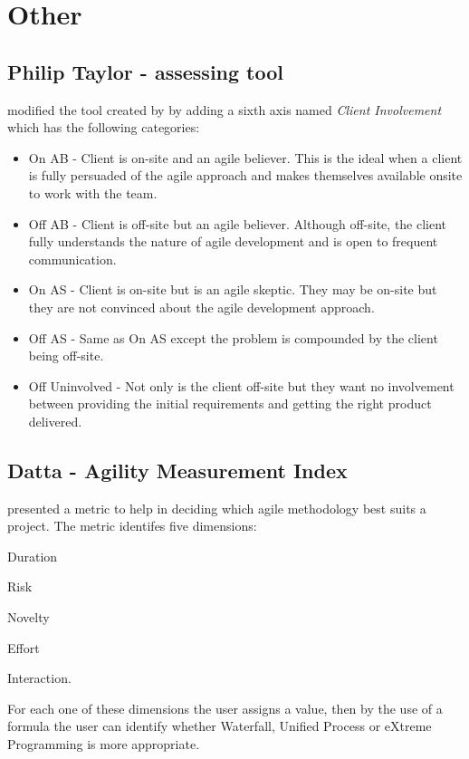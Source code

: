 \section{Other}

\subsection{Philip Taylor - assessing tool} 
\citet{taylor} modified the tool created by \citet{1231450} by adding a sixth axis named  \textit{Client Involvement} which has the following categories:

\begin{itemize}
\item On AB - Client is on-site and an agile believer. This is the ideal when a client is fully persuaded of the agile approach and makes themselves available onsite to work with the team.
\item Off AB - Client is off-site but an agile believer. Although off-site, the client fully understands the nature of agile development and is open to frequent communication.
\item On AS - Client is on-site but is an agile skeptic. They may be on-site but they are not convinced about the agile development approach.
\item Off AS - Same as On AS except the problem is compounded by the client being off-site.
\item Off Uninvolved - Not only is the client off-site but they want no involvement between providing the initial requirements and getting the right product delivered.
\end{itemize}

\subsection{Datta - Agility Measurement Index}
\cite{datta_dissertation} presented a metric to help in deciding which agile methodology best suits a project. The metric identifes five dimensions: 
\begin{inparaenum} [a\upshape)]
\item Duration
\item Risk
\item Novelty
\item Effort
\item Interaction.
\end{inparaenum}
For each one of these dimensions the user assigns a value, then by the use of a formula the user can identify whether Waterfall, Unified Process or eXtreme Programming is more appropriate.

